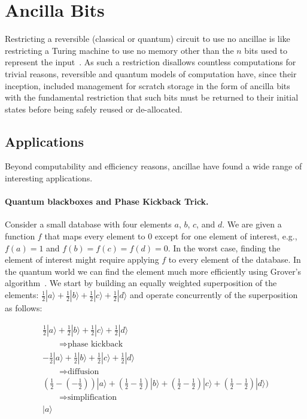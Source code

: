 \documentclass[sigplan,10pt,review,anonymous]{acmart}
\newcommand{\ket}[1]{|#1\rangle}
\begin{document}
\section{Ancilla Bits}
\label{sec:examples}
 
Restricting a reversible (classical or quantum) circuit to use no
ancillae is like restricting a Turing machine to use no memory other
than the $n$ bits used to represent the
input~\cite{DBLP:conf/innovations/AaronsonGS17}. As such a restriction
disallows countless computations for trivial reasons, reversible and
quantum models of computation have, since their inception, included
management for scratch storage in the form of ancilla
bits~\cite{Toffoli:1980} with the fundamental restriction that such
bits must be returned to their initial states before being safely
reused or de-allocated.

\subsection{Applications}
 
Beyond computability and efficiency reasons, ancillae have found a
wide range of interesting applications. 

\paragraph*{Quantum blackboxes and Phase Kickback Trick.} Consider a
small database with four elements $a$, $b$, $c$, and $d$. We are given
a function $f$ that maps every element to $0$ except for one element
of interest, e.g., $f(a)=1$ and $f(b)=f(c)=f(d)=0$. In the worst case,
finding the element of interest might require applying $f$ to every
element of the database. In the quantum world we can find the element
much more efficiently using Grover's
algorithm~\cite{Grover:1996:FQM:237814.237866}. We start by building
an equally weighted superposition of the elements:
$\frac{1}{2}\ket{a}+\frac{1}{2}\ket{b}+\frac{1}{2}\ket{c}+\frac{1}{2}\ket{d}$
and operate concurrently of the superposition as follows:

\[\begin{array}{l}
\frac{1}{2}\ket{a}+\frac{1}{2}\ket{b}+\frac{1}{2}\ket{c}+\frac{1}{2}\ket{d}\\ [1.5ex]
\qquad\Rightarrow  \textrm{phase kickback} \\ [1.5ex]
-\frac{1}{2}\ket{a}+\frac{1}{2}\ket{b}+\frac{1}{2}\ket{c}+\frac{1}{2}\ket{d}\\ [1.5ex]
\qquad\Rightarrow  \textrm{diffusion} \\ [1.5ex]
 (\frac{1}{2}-(-\frac{1}{2}))\ket{a}+(\frac{1}{2}-\frac{1}{2})\ket{b}+(\frac{1}{2}-\frac{1}{2})\ket{c}+(\frac{1}{2}-\frac{1}{2})\ket{d})\\ [1.5ex]
\qquad\Rightarrow  \textrm{simplification} \\ [1.5ex]
\ket{a}
\end{array}\]
\end{document}
